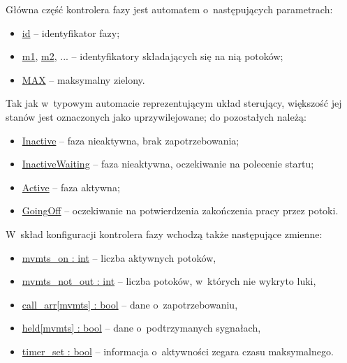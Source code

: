 \documentclass{pracamgr}
\theoremstyle{plain}
\begin{document}
Główna część kontrolera fazy jest automatem o~następujących
parametrach:
\begin{itemize}
  \item \url{id} -- identyfikator fazy;
  \item \url{m1}, \url{m2}, ... -- identyfikatory składających się na
  nią potoków;
  \item \url{MAX} -- maksymalny zielony.
\end{itemize}
Tak jak w~typowym automacie reprezentującym układ sterujący, większość jej
stanów jest oznaczonych jako uprzywilejowane; do pozostałych należą:
\begin{itemize}
  \item \url{Inactive} -- faza nieaktywna, brak zapotrzebowania;
  \item \url{InactiveWaiting} -- faza nieaktywna, oczekiwanie na
  polecenie startu;
  \item \url{Active} -- faza aktywna;
  \item \url{GoingOff} -- oczekiwanie na potwierdzenia zakończenia
  pracy przez potoki.
\end{itemize}
W~skład konfiguracji kontrolera fazy wchodzą także następujące zmienne:
\begin{itemize}
  \item \url{mvmts_on : int} -- liczba aktywnych potoków,
  \item \url{mvmts_not_out : int} -- liczba potoków, w~których nie wykryto luki,
  \item \url{call_arr[mvmts] : bool} -- dane o~zapotrzebowaniu,
  \item \url{held[mvmts] : bool} -- dane o~podtrzymanych sygnałach,
  \item \url{timer_set : bool} -- informacja o~aktywności zegara czasu
  maksymalnego.
\end{itemize}
\end{document}
